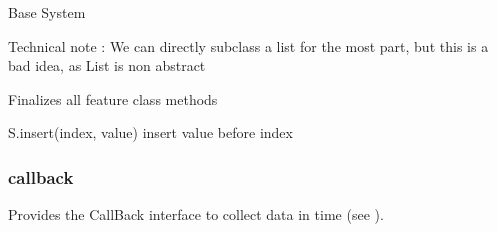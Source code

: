 \documentclass[letterpaper,10pt,english]{sphinxmanual}
\begin{document}
\begin{fulllineitems}
\label{\detokenize{documentation:elastica.wrappers.base_system.BaseSystemCollection}}
Base System

Technical note : We can directly subclass a list for the
most part, but this is a bad idea, as List is non abstract

\begin{fulllineitems}
\label{\detokenize{documentation:elastica.wrappers.base_system.BaseSystemCollection.finalize}}
Finalizes all feature class methods

\end{fulllineitems}


\begin{fulllineitems}
\label{\detokenize{documentation:elastica.wrappers.base_system.BaseSystemCollection.insert}}
S.insert(index, value) \textendash{} insert value before index

\end{fulllineitems}


\end{fulllineitems}

\label{\detokenize{documentation:module-elastica.wrappers.callbacks}}

\subsubsection{callback}
\label{\detokenize{documentation:callback}}
Provides the CallBack interface to collect data in time (see ).
\label{\detokenize{documentation:module-elastica.wrappers.connections}}
\end{document}
